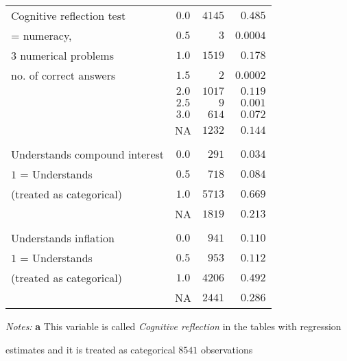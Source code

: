 \documentclass[a4paper,12pt]{article}
\begin{document}
{\begin{threeparttable}
\begin{small}
\begin{tabular}{l|crr}
  
Cognitive reflection test\tnote{a}&\multicolumn{1}{c}{$0.0$}&$4145$&$0.485$\\ 
 \hspace{0.25cm}= numeracy, \citet{Frederick2005} &\multicolumn{1}{c}{$0.5$}&$3$&$0.0004$\\ 
   \hspace{0.25cm}$3$ numerical problems&\multicolumn{1}{c}{$1.0$}&$1519$&$0.178$\\ 
  \hspace{0.25cm}no. of correct answers&\multicolumn{1}{c}{$1.5$}&$2$&$0.0002$\\ 
&\multicolumn{1}{c}{$2.0$}&$1017$&$0.119$\\ 
&\multicolumn{1}{c}{$2.5$}&$9$&$0.001$\\ 
&\multicolumn{1}{c}{$3.0$}&$614$&$0.072$\\ 
&\multicolumn{1}{c}{NA}&$1232$&$0.144$\\ 

 \hline  \vspace{-0.27cm}\\
Understands compound interest&\multicolumn{1}{c}{$0.0$}&$291$&$0.034$\\ 
  \hspace{0.25cm}$1$ = Understands&\multicolumn{1}{c}{$0.5$}&$718$&$0.084$\\ 
    \hspace{0.25cm}(treated as categorical)&\multicolumn{1}{c}{$1.0$}&$5713$&$0.669$\\ 
&\multicolumn{1}{c}{NA}&$1819$&$0.213$\\ 
 \hline  \vspace{-0.27cm}\\
Understands inflation&\multicolumn{1}{c}{$0.0$}&$941$&$0.110$\\ 
  \hspace{0.25cm}$1$ = Understands&\multicolumn{1}{c}{$0.5$}&$953$&$0.112$\\ 
    \hspace{0.25cm}(treated as categorical)&\multicolumn{1}{c}{$1.0$}&$4206$&$0.492$\\ 
&\multicolumn{1}{c}{NA}&$2441$&$0.286$\\ 
\hline
\end{tabular} 
\end{small}
 \begin{tablenotes}
  \begin{footnotesize}
     \item[~]\textit{Notes:}  \textbf{a} This variable is called \textit{Cognitive reflection} in the tables with regression
          \begin{adjustwidth}{0.7cm}{}  
  estimates and it is treated as categorical \hfill $8541$ observations
    \end{adjustwidth}
\singlespacing
  \end{footnotesize}
\end{tablenotes}
  \end{threeparttable} 
\par}
\end{document}
